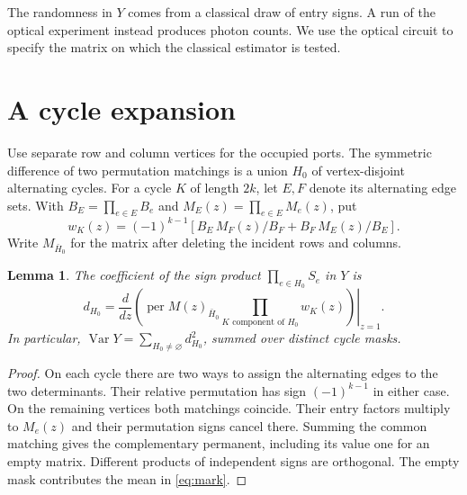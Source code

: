 \documentclass[11pt]{article}
\newtheorem{lemma}[theorem]{Lemma}
\DeclareMathOperator{\per}{per}
\DeclareMathOperator{\Var}{Var}
\begin{document}
The randomness in \(Y\) comes from a classical draw of entry signs. A run of the optical experiment instead produces photon counts. We use the optical circuit to specify the matrix on which the classical estimator is tested.

\section{A cycle expansion}
Use separate row and column vertices for the occupied ports. The symmetric difference of two permutation matchings is a union \(H_0\) of vertex-disjoint alternating cycles. For a cycle \(K\) of length \(2k\), let \(E,F\) denote its alternating edge sets. With \(B_E=\prod_{e\in E}B_e\) and \(M_E(z)=\prod_{e\in E}M_e(z)\), put
\[
 w_K(z)=(-1)^{k-1}\left[B_E\,M_F(z)/B_F+B_F\,M_E(z)/B_E\right].
\]
Write \(M_{\bar H_0}\) for the matrix after deleting the incident rows and columns.
\begin{lemma}\label{lem:cycles}
The coefficient of the sign product \(\prod_{e\in H_0}S_e\) in \(Y\) is
\[
 d_{H_0}=\left.\frac{d}{dz}
     \left(\per M(z)_{\bar H_0}\prod_{K\text{ component of }H_0}w_K(z)\right)\right|_{z=1}.
\]
In particular, \(\Var Y=\sum_{H_0\ne\varnothing}d_{H_0}^2\), summed over distinct cycle masks.
\end{lemma}
\begin{proof}
On each cycle there are two ways to assign the alternating edges to the two determinants. Their relative permutation has sign \((-1)^{k-1}\) in either case. On the remaining vertices both matchings coincide. Their entry factors multiply to \(M_e(z)\) and their permutation signs cancel there. Summing the common matching gives the complementary permanent, including its value one for an empty matrix. Different products of independent signs are orthogonal. The empty mask contributes the mean in \eqref{eq:mark}.
\end{proof}
\end{document}
